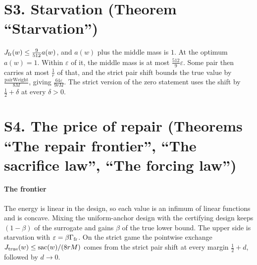 
\section{S3. Starvation (Theorem ``Starvation'')}

$J_{\rm fr}(w)\le\frac{9}{512}a(w)$, and $a(w)$ plus the middle mass is $1$. At the optimum
$a(w)=1$. Within $\varepsilon$ of it, the middle mass is at most $\frac{512}{9}\varepsilon$.
Some pair then carries at most $\frac1r$ of that, and the strict pair shift bounds the true
value by $\frac{\mathrm{pairWeight}}{8M}$, giving $\frac{64\varepsilon}{9rM}$. The strict version
of the zero statement uses the shift by $\frac12+\delta$ at every $\delta>0$.




\section{S4. The price of repair (Theorems ``The repair frontier'', ``The sacrifice law'',
``The forcing law'')}

\paragraph{The frontier} The energy is linear in the design, so each value is an infimum of
linear functions and is concave. Mixing the uniform-anchor design with the certifying design
keeps $(1-\beta)$ of the surrogate and gains $\beta$ of the true lower bound. The upper side is
starvation with $\varepsilon=\beta\Gamma_{\rm fr}$. On the strict game the pointwise exchange
$J_{\rm true}(w)\le\mathrm{sac}(w)/(8rM)$ comes from the strict pair shift at every margin
$\frac12+d$, followed by $d\to0$.

